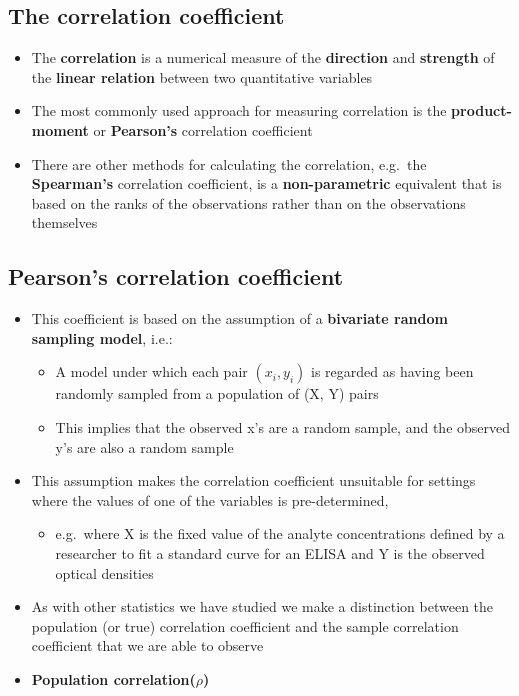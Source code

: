 \documentclass[
]{book}
\providecommand{\tightlist}{%
  \setlength{\itemsep}{0pt}\setlength{\parskip}{0pt}}
\begin{document}
\hypertarget{the-correlation-coefficient}{%
\subsection{The correlation coefficient}\label{the-correlation-coefficient}}

\begin{itemize}
\tightlist
\item
  The \textbf{correlation} is a numerical measure of the \textbf{direction} and \textbf{strength} of the \textbf{linear relation} between two quantitative variables
\item
  The most commonly used approach for measuring correlation is the \textbf{product-moment} or \textbf{Pearson's} correlation coefficient
\item
  There are other methods for calculating the correlation, e.g.~the \textbf{Spearman's} correlation coefficient, is a \textbf{non-parametric} equivalent that is based on the ranks of the observations rather than on the observations themselves
\end{itemize}

\hypertarget{pearsons-correlation-coefficient}{%
\subsection{Pearson's correlation coefficient}\label{pearsons-correlation-coefficient}}

\begin{itemize}
\tightlist
\item
  This coefficient is based on the assumption of a \textbf{bivariate random sampling model}, i.e.:

  \begin{itemize}
  \tightlist
  \item
    A model under which each pair \((x_i, y_i)\) is regarded as having been randomly sampled from a population of (X, Y) pairs
  \item
    This implies that the observed x's are a random sample, and the observed y's are also a random sample
  \end{itemize}
\item
  This assumption makes the correlation coefficient unsuitable for settings where the values of one of the variables is pre-determined,

  \begin{itemize}
  \tightlist
  \item
    e.g.~where X is the fixed value of the analyte concentrations defined by a researcher to fit a standard curve for an ELISA and Y is the observed optical densities
  \end{itemize}
\item
  As with other statistics we have studied we make a distinction between the population (or true) correlation coefficient and the sample correlation coefficient that we are able to observe
\item
  \textbf{Population correlation(\(\rho\))}
\end{itemize}
\end{document}
